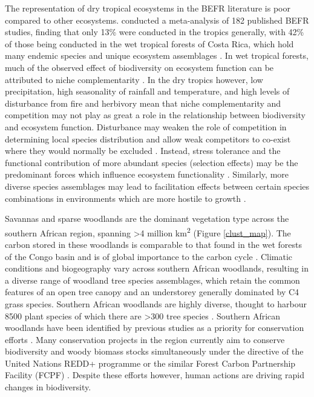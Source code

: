 \documentclass[11pt,a4paper]{article}
\begin{document}
The representation of dry tropical ecosystems in the BEFR literature is poor compared to other ecosystems. \citet{Clarke2017} conducted a meta-analysis of 182 published BEFR studies, finding that only 13\% were conducted in the tropics generally, with 42\% of those being conducted in the wet tropical forests of Costa Rica, which hold many endemic species and unique ecosystem assemblages \citep{Barthlott2005}. In wet tropical forests, much of the observed effect of biodiversity on ecosystem function can be attributed to niche complementarity \citep{Wright2017, Poorter2015, Sande2017a}. In the dry tropics however, low precipitation, high seasonality of rainfall and temperature, and high levels of disturbance from fire and herbivory mean that niche complementarity and competition may not play as great a role in the relationship between biodiversity and ecosystem function. Disturbance may weaken the role of competition in determining local species distribution and allow weak competitors to co-exist where they would normally be excluded \citep{Grime1979,Grace1990}. Instead, stress tolerance and the functional contribution of more abundant species (selection effects) may be the predominant forces which influence ecosystem functionality \citep{Lasky2014, Tobner2016}. Similarly, more diverse species assemblages may lead to facilitation effects between certain species combinations in environments which are more hostile to growth \citep{Ratcliffe2017}.

Savannas and sparse woodlands are the dominant vegetation type across the southern African region, spanning >4 million km\textsuperscript{2} \citep{Ryan2016} (Figure \autoref{clust_map}). The carbon stored in these woodlands is comparable to that found in the wet forests of the Congo basin and is of global importance to the carbon cycle \citep{Houghton2009, Mayaux2008}. Climatic conditions and biogeography vary across southern African woodlands, resulting in a diverse range of woodland tree species assemblages, which retain the common features of an open tree canopy and an understorey generally dominated by C4 grass species. Southern African woodlands are highly diverse, thought to harbour \textapprox{}8500 plant species of which there are >300 tree species \citep{Frost1996}. Southern African woodlands have been identified by previous studies as a priority for conservation efforts \citep{Byers2001, Mittermeier2003}. Many conservation projects in the region currently aim to conserve biodiversity and woody biomass stocks simultaneously under the directive of the United Nations REDD+ programme or the similar Forest Carbon Partnership Facility (FCPF) \citep{Hinsley2015}. Despite these efforts however, human actions are driving rapid changes in biodiversity. 
\end{document}
